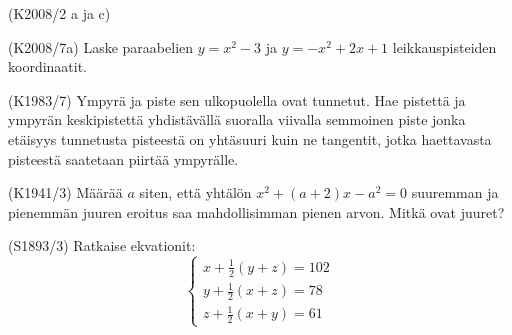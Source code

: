 \begin{tehtava} (K2008/2 a ja c)
  \begin{alakohdat}
  \end{alakohdat}
\end{tehtava}


\begin{tehtava}(K2008/7a)
Laske paraabelien $y=x^2-3$ ja $y=-x^2+2x+1$ leikkauspisteiden koordinaatit.
\end{tehtava}

\begin{tehtava}(K1983/7)
Ympyrä ja piste sen ulkopuolella ovat tunnetut. Hae pistettä ja ympyrän keskipistettä yhdistävällä suoralla viivalla semmoinen piste jonka etäisyys tunnetusta pisteestä on yhtäsuuri kuin ne tangentit, jotka haettavasta pisteestä saatetaan piirtää ympyrälle. 
\end{tehtava}


\begin{tehtava}(K1941/3)
Määrää $a$ siten, että yhtälön $x^2+(a+2)x-a^2=0$ suuremman ja pienemmän juuren eroitus saa mahdollisimman pienen arvon. Mitkä ovat juuret? 
\end{tehtava}


\begin{tehtava}(S1893/3)
Ratkaise ekvationit:
\[
\left\{
\begin{aligned}
 x+\frac{1}{2}(y+z)=102    \\
 y+\frac{1}{2}(x+z)=78  \\
 z+\frac{1}{2}(x+y)=61
\end{aligned}
\right. 
\]
\end{tehtava}

